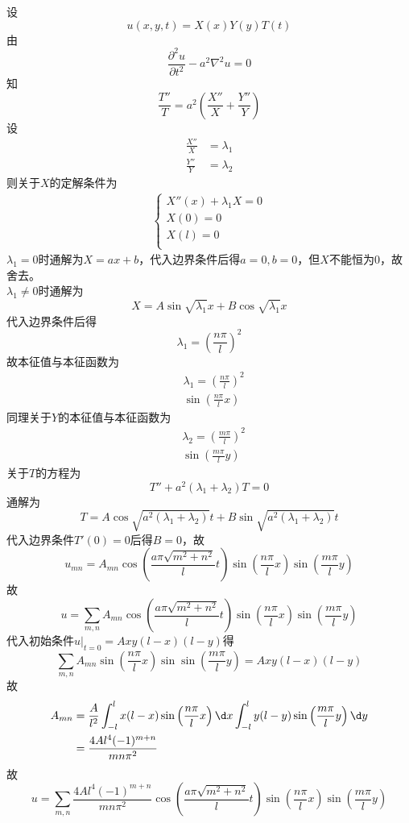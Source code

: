 \documentclass{phyasgn}
\begin{document}
\begin{sol}[2]
    设
    $$u(x,y,t)=X(x)Y(y)T(t)$$
    由
    $$\frac{\partial^2u}{\partial t^2}-a^2\nabla^2u=0$$
    知
    $$\frac{T''}{T}=a^2\left(\frac{X''}{X}+\frac{Y''}{Y}\right)$$
    设\begin{align*}
        \frac{X''}{X}&=\lambda_1\\
        \frac{Y''}{Y}&=\lambda_2
    \end{align*}
    则关于$X$的定解条件为
    \begin{align*}
        \left\{\begin{matrix}
            X''(x)+\lambda_1X=0\\
            X(0)=0\\
            X(l)=0\\
        \end{matrix}\right.
    \end{align*}
    $\lambda_1=0$时通解为$X=ax+b$，代入边界条件后得$a=0,b=0$，但$X$不能恒为$0$，故舍去。\\
    $\lambda_1\neq 0$时通解为
    $$X=A\sin\sqrt{\lambda_1}x+B\cos\sqrt{\lambda_1}x$$
    代入边界条件后得
    $$\lambda_1=\left(\frac{n\pi}{l}\right)^2$$
    故本征值与本征函数为
    \begin{align*}
        &\lambda_1=\left(\frac{n\pi}{l}\right)^2\\
        &\sin\left(\frac{n\pi}{l}x\right)
    \end{align*}
    同理关于$Y$的本征值与本征函数为
    \begin{align*}
        &\lambda_2=\left(\frac{m\pi}{l}\right)^2\\
        &\sin\left(\frac{m\pi}{l}y\right)
    \end{align*}
    关于$T$的方程为
    $$T''+a^2(\lambda_1+\lambda_2)T=0$$
    通解为
    $$T=A\cos\sqrt{a^2(\lambda_1+\lambda_2)}t+B\sin\sqrt{a^2(\lambda_1+\lambda_2)}t$$
    代入边界条件$T'(0)=0$后得$B=0$，故
    $$u_{mn}=A_{mn}\cos(\frac{a\pi\sqrt{m^2+n^2}}{l}t)\sin\left(\frac{n\pi}{l}x\right)\sin\left(\frac{m\pi}{l}y\right)$$
    故
    $$u=\displaystyle\sum_{m,n}A_{mn}\cos\left(\frac{a\pi\sqrt{m^2+n^2}}{l}t\right)\sin\left(\frac{n\pi}{l}x\right)\sin\left(\frac{m\pi}{l}y\right)$$
    代入初始条件$u|_{t=0}=Axy(l-x)(l-y)$得
    $$\displaystyle\sum_{m,n}A_{mn}\sin\left(\frac{n\pi}{l}x\right)\sin\sin\left(\frac{m\pi}{l}y\right)=Axy(l-x)(l-y)$$
    故\begin{align*}
        A_{mn}&=\frac{A}{l^2}\int_{-l}^{l}x(l-x)\sin\left(\frac{n\pi}{l}x\right)\d x\int_{-l}^{l}y(l-y)\sin\left(\frac{m\pi}{l}y\right)\d y\\
        &=\frac{4Al^4(-1)^{m+n}}{mn\pi^2}
    \end{align*}
    故
    $$u=\displaystyle\sum_{m,n}\frac{4Al^4(-1)^{m+n}}{mn\pi^2}\cos\left(\frac{a\pi\sqrt{m^2+n^2}}{l}t\right)\sin\left(\frac{n\pi}{l}x\right)\sin\left(\frac{m\pi}{l}y\right)$$
\end{sol}\par
\end{document}
